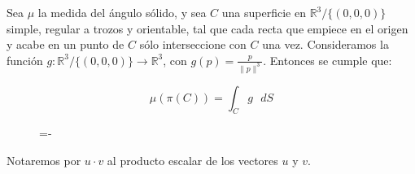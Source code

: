 \begin{proposicion}\label{angSolido1}
  Sea $\mu$ la medida del ángulo sólido, y sea $C$ una superficie en $\mathds{R}^3/\{(0,0,0)\}$ simple, regular a trozos y orientable, tal que cada recta que empiece en el origen y acabe en un punto de $C$ sólo interseccione con $C$ una vez. Consideramos la función $g:\mathds{R}^3/\{(0,0,0)\} \rightarrow \mathds{R}^3$, con $g(p)=\frac{p}{\|p\|^3}$. Entonces se cumple que:

 \begin{equation}
 \mu (\pi(C)) = \int _C g \text{ }dS 
 \end{equation}
 
\end{proposicion}

\begin{figure}[h]
  \lineskip=-\fboxrule
\end{figure}

\begin{notacion}
Notaremos por $u \cdot v$ al producto escalar de los vectores $u$ y $v$.
\end{notacion}

